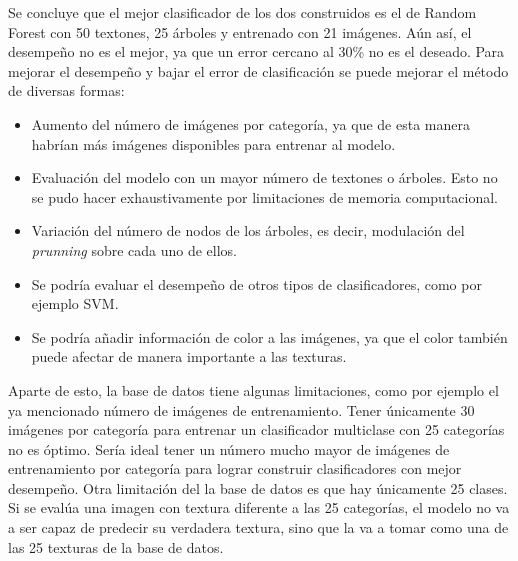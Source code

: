 \documentclass[10pt,twocolumn,letterpaper]{article}
\begin{document}
Se concluye que el mejor clasificador de los dos construidos es el de Random Forest con 50 textones, 25 árboles y entrenado con 21 imágenes. Aún así, el desempeño no es el mejor, ya que un error cercano al 30\% no es el deseado. Para mejorar el desempeño y bajar el error de clasificación se puede mejorar el método de diversas formas:
\begin{itemize}
\item Aumento del número de imágenes por categoría, ya que de esta manera habrían más imágenes disponibles para entrenar al modelo.
\item Evaluación del modelo con un mayor número de textones o árboles. Esto no se pudo hacer exhaustivamente por limitaciones de memoria computacional.
\item Variación del número de nodos de los árboles, es decir, modulación del \textit{prunning} sobre cada uno de ellos.
\item Se podría evaluar el desempeño de otros tipos de clasificadores, como por ejemplo SVM.
\item Se podría añadir información de color a las imágenes, ya que el color también puede afectar de manera importante a las texturas.
\end{itemize}

Aparte de esto, la base de datos tiene algunas limitaciones, como por ejemplo el ya mencionado número de imágenes de entrenamiento. Tener únicamente 30 imágenes por categoría para entrenar un clasificador multiclase con 25 categorías no es óptimo. Sería ideal tener un número mucho mayor de imágenes de entrenamiento por categoría para lograr construir clasificadores con mejor desempeño. Otra limitación del la base de datos es que hay únicamente 25 clases. Si se evalúa una imagen con textura diferente a las 25 categorías, el modelo no va a ser capaz de predecir su verdadera textura, sino que la va a tomar como una de las 25 texturas de la base de datos. 



{\small

{}
}
\end{document}
